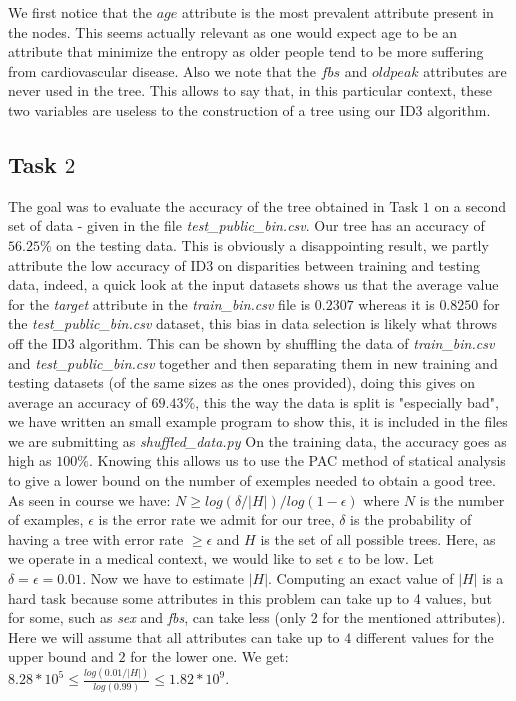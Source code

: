 \documentclass[9pt]{extarticle}
\begin{document}
	We first notice that the $age$ attribute is the most prevalent attribute present in the nodes. This seems actually relevant as one would expect age to be an attribute that minimize the entropy as older people tend to be more suffering from cardiovascular disease. Also we note that the $fbs$ and $oldpeak$ attributes are never used in the tree. This allows to say that, in this particular context, these two variables are useless to the construction of a tree using our ID3 algorithm.
		
		
\subsection{Task $2$}
	The goal was to evaluate the accuracy of the tree obtained in Task $1$ on a second set of data - given in the file \emph{test\_public\_bin.csv}.
	Our tree has an accuracy of $56.25\%$ on the testing data. This is obviously a disappointing result, we partly attribute the low accuracy of ID3 on disparities between training and testing data, indeed, a quick look at the input datasets shows us that the average value for the \emph{target} attribute in the \emph{train\_bin.csv} file is $0.2307$ whereas it is $0.8250$ for the \emph{test\_public\_bin.csv} dataset, this bias in data selection is likely what throws off the ID3 algorithm. This can be shown by shuffling the data of \emph{train\_bin.csv} and \emph{test\_public\_bin.csv} together and then separating them in new training and testing datasets (of the same sizes as the ones provided), doing this gives on average an accuracy of $69.43\%$, this the way the data is split is "especially bad", we have written an small example program to show this, it is included in the files we are submitting as \emph{shuffled\_data.py}	
	On the training data, the accuracy goes as high as $100\%$. Knowing this allows us to use the PAC method of statical analysis to give a lower bound on the number of exemples needed to obtain a good tree. As seen in course we have:
	$N\geq{log(\delta/|H|)}/{log(1-\epsilon)}$
where $N$ is the number of examples, $\epsilon$ is the error rate we admit for our tree, $\delta$ is the probability of having a tree with error rate $\geq\epsilon$ and $H$ is the set of all possible trees. Here, as we operate in a medical context, we would like to set $\epsilon$  to be low. Let $\delta=\epsilon= 0.01$. Now we have to estimate $|H|$. Computing an exact value of $|H|$ is a hard task because some attributes in this problem can take up to 4 values, but for some, such as \emph{sex} and \emph{fbs}, can take less (only 2 for the mentioned attributes). Here we will assume that all attributes can take up to $4$ different values for the upper bound and $2$ for the lower one. We get: $8.28*10^5\leq\frac{log(0.01/|H|)}{log(0.99)}\leq1.82*10^9.$ \\
	
\end{document}
